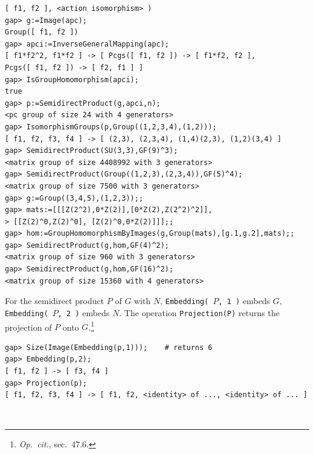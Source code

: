 \documentclass[11pt]{amsart}
\theoremstyle{plain}
\newcommand{\subsectionspace}{~\\[-6pt]}
\newcommand{\codesize}{\footnotesize}
\newcommand{\<}{\ensuremath{\langle}}
\renewcommand{\>}{\ensuremath{\rangle}}
\begin{document}
\begin{itemize}
{\begin{verbatim}
[ f1, f2 ], <action isomorphism> )
gap> g:=Image(apc);
Group([ f1, f2 ])
gap> apci:=InverseGeneralMapping(apc);
[ f1*f2^2, f1*f2 ] -> [ Pcgs([ f1, f2 ]) -> [ f1*f2, f2 ],
Pcgs([ f1, f2 ]) -> [ f2, f1 ] ]
gap> IsGroupHomomorphism(apci);
true
gap> p:=SemidirectProduct(g,apci,n);
<pc group of size 24 with 4 generators>
gap> IsomorphismGroups(p,Group((1,2,3,4),(1,2)));
[ f1, f2, f3, f4 ] -> [ (2,3), (2,3,4), (1,4)(2,3), (1,2)(3,4) ]
gap> SemidirectProduct(SU(3,3),GF(9)^3);
<matrix group of size 4408992 with 3 generators>
gap> SemidirectProduct(Group((1,2,3),(2,3,4)),GF(5)^4);
<matrix group of size 7500 with 3 generators>
gap> g:=Group((3,4,5),(1,2,3));;
gap> mats:=[[[Z(2^2),0*Z(2)],[0*Z(2),Z(2^2)^2]],
> [[Z(2)^0,Z(2)^0], [Z(2)^0,0*Z(2)]]];;
gap> hom:=GroupHomomorphismByImages(g,Group(mats),[g.1,g.2],mats);;
gap> SemidirectProduct(g,hom,GF(4)^2);
<matrix group of size 960 with 3 generators>
gap> SemidirectProduct(g,hom,GF(16)^2);
<matrix group of size 15360 with 4 generators>
\end{verbatim}}
\noindent For the semidirect product $P$ of $G$ with $N$, {\tt Embedding( $P$, 1 )}
embeds $G$, {\tt Embedding( $P$, 2 )} embeds $N$. The operation {\tt Projection(P)}
returns the projection of $P$ onto $G$.\footnote{{\it Op.~cit.}, sec.~47.6.}
{\codesize
\begin{verbatim}
gap> Size(Image(Embedding(p,1)));    # returns 6
gap> Embedding(p,2);
[ f1, f2 ] -> [ f3, f4 ]
gap> Projection(p);
[ f1, f2, f3, f4 ] -> [ f1, f2, <identity> of ..., <identity> of ... ]

\end{verbatim}}

\end{itemize}
\subsectionspace
\end{document}
